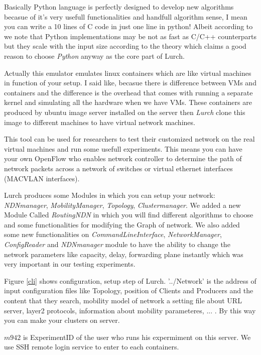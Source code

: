 Basically Python language is perfectly designed to develop new algorithms becasue of it's very usefull functionalities and handfull algorithm sense, I mean you can write a 10 lines of C code in just one line in python! Albeit according to \cite{python} we note that Python implementations may be not as fast as C/C++ counterparts but they scale with the input size according to the theory which claims a good reason to choose \textit{Python} anyway as the core part of Lurch.

Actually this emulator emulates linux containers which are like virtual machines in function of your setup. I said like, becasue there is difference between VMs and containers and the difference is the overhead that comes with running a separate kernel and simulating all the hardware when we have VMs. These containers are produced by ubuntu image server installed on the server then \textit{Lurch} clone this image to different machines to have virtual network machines. 

This tool can be used for researchers to test their customized network on the real virtual machines and run some usefull experiments. This means you can have your own OpenFlow who enables network controller to determine the path of network packets across a network of switches or virtual ethernet interfaces (MACVLAN interfaces).

Lurch produces some Modules in which you can setup your network: \textit{NDNmanager}, \textit{MobilityManager}, \textit{Topology}, \textit{Clustermanager}. We added a new Module Called \textit{RoutingNDN} in which you will find different algorithms to choose and some functionalities for modifying the Graph of network.
We also added some new functionalities on \textit{CommandLineInterface}, \textit{NetworkManager}, \textit{ConfigReader} and \textit{NDNmanager} module to have the ability to change the network parameters like capacity, delay, forwarding plane instantly which was very important in our testing experiments.

Figure \ref{cli} shows configuration, setup step of Lurch.
'../Network' is the address of input configuration files like Topology, position of Clients and Producers and the content that they search, mobility model of network a setting file about URL server, layer2 protocols, information about mobility parameteres, ... . By this way you can make your clusters on server.

$m942$ is ExperimentID of the user who runs his expermiment on this server. We use SSH remote login service to enter to each containers.


